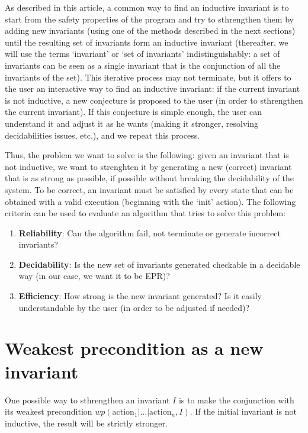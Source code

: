 \documentclass[11pt,a4paper,oldfontcommands,openany]{memoir}
\begin{document}
    As described in this article\cite{Karbyshev:2017:PIU:3065931.3022187}, a common way to find an inductive invariant is to start from the safety properties of the program
    and try to sthrengthen them by adding new invariants (using one of the methods described in the next sections) until the resulting set of invariants form an inductive invariant
    (thereafter, we will use the terms `invariant' or `set of invariants' indistinguishably: a set of invariants can be seen as a single invariant that is the conjunction of all the invariants of the set).
    This iterative process may not terminate, but it offers to the user an interactive way to find an inductive invariant:
    if the current invariant is not inductive, a new conjecture is proposed to the user (in order to sthrengthen the current invariant).
    If this conjecture is simple enough, the user can understand it and adjust it as he wants (making it stronger, resolving decidabilities issues, etc.), and we repeat this process.

    Thus, the problem we want to solve is the following:
    given an invariant that is not inductive, we want to strenghten it by generating a new (correct) invariant that is as strong as possible, if possible without breaking the decidability of the system.
    To be correct, an invariant must be satisfied by every state that can be obtained with a valid execution (beginning with the `init' action).
    The following criteria can be used to evaluate an algorithm that tries to solve this problem:
    \begin{enumerate}
        \item \textbf{Reliability}: Can the algorithm fail, not terminate or generate incorrect invariants?
        \item \textbf{Decidability}: Is the new set of invariants generated checkable in a decidable way (in our case, we want it to be EPR)?
        \item \textbf{Efficiency}: How strong is the new invariant generated? Is it easily understandable by the user (in order to be adjusted if needed)?
    \end{enumerate}

    \section{Weakest precondition as a new invariant}

    One possible way to sthrengthen an invariant \(I\) is to make the conjunction with its weakest precondition \(wp(\text{action}_1|\ldots|\text{action}_n,I)\).
    If the initial invariant is not inductive, the result will be strictly stronger.
\end{document}
